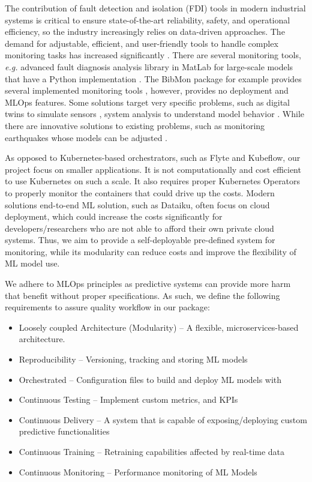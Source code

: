 \documentclass[preprint,12pt, a4paper]{elsarticle}
\begin{document}
The contribution of fault detection and isolation (FDI) tools in modern industrial systems is critical to ensure state-of-the-art reliability, safety, and operational efficiency, so the industry increasingly relies on data-driven approaches. The demand for adjustable, efficient, and user-friendly tools to handle complex monitoring tasks has increased significantly \cite{ZONTA2020106889}. There are several monitoring tools, \textit{e.g.} advanced fault diagnosis analysis library in MatLab for large-scale models that have a Python implementation \citep{FRISK20173287}. The BibMon package for example provides several implemented monitoring tools \citep{MELO2024100182}, however, provides no deployment and MLOps features. Some solutions target very specific problems, such as digital twins to simulate sensors \citep{dig_twin}, system analysis to understand model behavior \citep{Schummer_Hyba_2022}. While there are innovative solutions to existing problems, such as monitoring earthquakes whose models can be adjusted \citep{LI2024105686}.

As opposed to Kubernetes-based orchestrators, such as Flyte and Kubeflow, our project focus on smaller applications. It is not computationally and cost efficient to use Kubernetes on such a scale. It also requires proper Kubernetes Operators to properly monitor the containers that could drive up the costs. Modern solutions end-to-end ML solution, such as Dataiku, often focus on cloud deployment, which could increase the costs significantly for developers/researchers who are not able to afford their own private cloud systems. Thus, we aim to provide a self-deployable pre-defined system for monitoring, while its modularity can reduce costs and improve the flexibility of ML model use.


We adhere to MLOps principles as predictive systems can provide more harm that benefit without proper specifications. As such, we define the following requirements to assure quality workflow in our package:
\begin{itemize}
\item Loosely coupled Architecture (Modularity) -- A flexible, microservices-based architecture.
\item Reproducibility -- Versioning, tracking and storing ML models
\item Orchestrated -- Configuration files to build and deploy ML models with
\item Continuous Testing -- Implement custom metrics, and KPIs
\item Continuous Delivery -- A system that is capable of exposing/deploying custom predictive functionalities
\item Continuous Training -- Retraining capabilities affected by real-time data
\item Continuous Monitoring -- Performance monitoring of ML Models 
\end{itemize}
\end{document}
